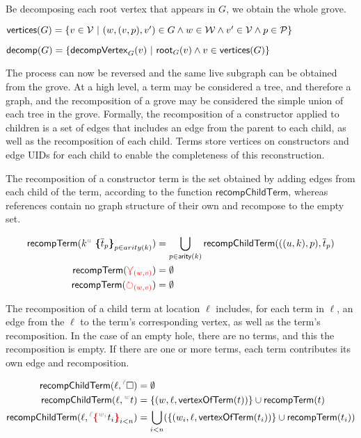 Be decomposing each root vertex that appears in $G$, we obtain the whole grove. 

\begin{definition}
    $\mathsf{vertices}(G) = \left\{v \in \mathcal{V} ~\vert~(w, (v,p), v') \in G \land w \in \mathcal{W} \land v' \in \mathcal{V} \land p \in \mathcal{P}\right\}$
\end{definition}

\begin{definition}
    $\mathsf{decomp}(G) = \left\{\mathsf{decompVertex}_{G}(v) ~\vert~\mathsf{root}_G(v) \land v \in \mathsf{vertices}(G)\right\}$
\end{definition}

The process can now be reversed and the same live subgraph can be obtained from the grove. At a high level, a term may be considered a tree, and therefore a graph, and the recomposition of a grove may be considered the simple union of each tree in the grove. Formally, the recomposition of a constructor applied to children is a set of edges that includes an edge from the parent to each child, as well as the recomposition of each child. Terms store vertices on constructors and edge UIDs for each child to enable the completeness of this reconstruction. 

The recomposition of a constructor term is the set obtained by adding edges from each child of the term, according to the function $\mathsf{recompChildTerm}$, whereas references contain no graph structure of their own and recompose to the empty set. 

\begin{definition}
    \begin{align*}
        \mathsf{recompTerm}(\genericTerm{u}{\subtermMV_p}) &= \bigcup_{p\in \mathsf{arity}(k)}\mathsf{recompChildTerm}(((u,k),p), \subtermMV_p)\\
        \mathsf{recompTerm}(\multiref) &= \emptyset\\
        \mathsf{recompTerm}(\uniref) &= \emptyset
    \end{align*}
\end{definition}

The recomposition of a child term at location $\ell$ includes, for each term in $\ell$, an edge from the $\ell$ to the term's corresponding vertex, as well as the term's recomposition. In the case of an empty hole, there are no terms, and this the recomposition is empty. If there are one or more terms, each term contributes its own edge and recomposition. 

\begin{definition}
    \begin{align*}
    \mathsf{recompChildTerm}(\ell, \ehole) &= \emptyset\\
    \mathsf{recompChildTerm}(\ell, \eid{w}{}\termMV) &= \SetOf{(w, \ell, \mathsf{vertexOfTerm}(\termMV))}\cup \mathsf{recompTerm}(t)\\
    \mathsf{recompChildTerm}(\ell, \conflictHoleTerm{\ell}{\eid{w_i}{}\termMV_i}_{i<n}) &= \bigcup_{i<n} (\SetOf{(w_i, \ell, \mathsf{vertexOfTerm}(\termMV_i))}\cup \mathsf{recompTerm}(t_i))
    \end{align*}
\end{definition}    

